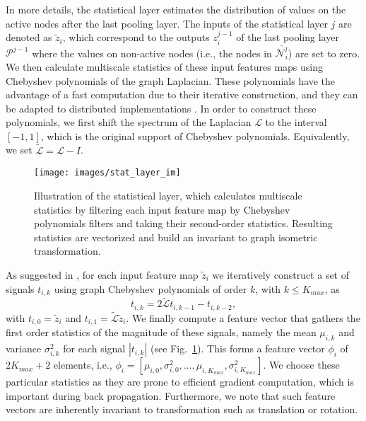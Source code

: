 \documentclass[10pt,journal,compsoc]{IEEEtran}
\begin{document}
	In more details, the statistical layer estimates the  distribution of values on the active nodes after the last pooling layer. The inputs of the statistical layer $j$ are denoted as $\tilde{z}_i$, which correspond to the outputs $z_i^{j-1}$ of the last pooling layer $\mathcal{P}^{j-1}$ where the values on non-active nodes (i.e., the nodes in $\overline{\mathcal{N}_i^{l}}$) are set to zero. We then calculate multiscale statistics of these input features maps using Chebyshev polynomials of the graph Laplacian. These polynomials have the advantage of a fast computation due to their iterative construction, and they can be adapted to distributed implementations \cite{bb:shuman2011chebyshev}. In order to construct these polynomials, we first shift the spectrum of the Laplacian $\mathcal{L}$ to the interval $[-1,1]$, which is the original support of Chebyshev polynomials. Equivalently, we set $\tilde{\mathcal{L}} = \mathcal{L} - I $.

	\begin{figure}[!t]
		\centering
		\texttt{[image: images/stat\_layer\_im]}
		\caption{Illustration of the statistical layer, which calculates multiscale statistics by filtering each input feature map by Chebyshev polynomials filters \cite{bb:shuman2011chebyshev} and taking their second-order statistics. Resulting statistics are vectorized and build an invariant to graph isometric transformation.
		}
		\label{fig:stat_layer_im}
	\end{figure}

	As suggested in \cite{bb:Mikhael}, for each input feature map $\tilde{z}_i$ we iteratively construct a set of signals $t_{i,k}$ using graph Chebyshev polynomials of order $k$, with $k \leq K_{max}$, as
	\begin{equation}
	t_{i,k} = 2 \tilde{\mathcal{L}} t_{i, k-1} - t_{i, k-2},
	\end{equation}
	\noindent
	with $t_{i, 0} = \tilde{z}_i$ and $t_{i, 1}=\tilde{\mathcal{L}} \tilde{z}_i$.
	We finally compute a feature vector that gathers the first order statistics of the magnitude of these signals, namely the mean $\mu_{i,k}$ and variance $\sigma^2_{i,k}$ for each signal $| t_{i,k} |$  (see Fig.~\ref{fig:stat_layer_im}). This forms a feature vector $\phi_{i}$ of $2 K_{max}+2$ elements, i.e., $\phi_{i} = [\mu_{i,0},\sigma^2_{i,0}, \hdots, \mu_{i,K_{max}},\sigma^2_{i,K_{max}} ]$. We choose these particular statistics as they are prone to efficient gradient computation, which is important during back propagation. Furthermore, we note that such feature vectors are inherently invariant to transformation such as translation or rotation.
\end{document}

